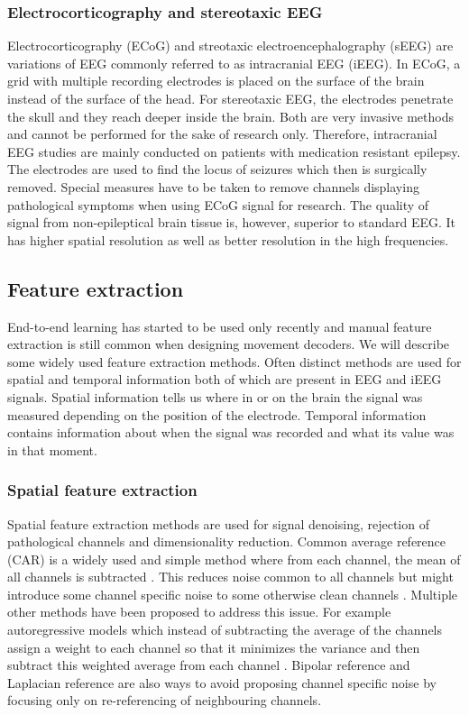 \subsubsection{Electrocorticography and stereotaxic EEG}
Electrocorticography (ECoG) and streotaxic electroencephalography (sEEG) are variations of EEG commonly referred to as intracranial EEG (iEEG).
In ECoG, a grid with multiple recording electrodes is placed on the surface of the brain instead of the surface of the head.
For stereotaxic EEG, the electrodes penetrate the skull and they reach deeper inside the brain. Both are very invasive methods and cannot be performed for the sake of research only.
Therefore, intracranial EEG studies are mainly conducted on patients with medication resistant epilepsy.
The electrodes are used to find the locus of seizures which then is surgically removed. Special measures have to be taken to remove channels displaying pathological symptoms when using ECoG signal for research.
The quality of signal from non-epileptical brain tissue is, however, superior to standard EEG. It has higher spatial resolution as well as better resolution in the high frequencies.

\subsection{Feature extraction}
End-to-end learning has started to be used only recently and manual feature extraction is still common when designing movement decoders.
We will describe some widely used feature extraction methods. 
Often distinct methods are used for spatial and temporal information both of which are present in EEG and iEEG signals. 
Spatial information tells us where in or on the brain the signal was measured depending on the position of the electrode.
Temporal information contains information about when the signal was recorded and what its value was in that moment.
\subsubsection{Spatial feature extraction}
Spatial feature extraction methods are used for signal denoising, rejection of pathological channels and dimensionality reduction.
 Common average reference (CAR) is a widely used and simple method where from each channel, the mean of all channels is subtracted \cite{liu-effects-2015}. This reduces noise common to all channels but might introduce some channel specific noise to some otherwise clean channels \cite{volkova-review}. Multiple other methods have been proposed to address this issue. For example autoregressive models which instead of subtracting the average of the channels assign a weight to each channel so that it minimizes the variance and then subtract this weighted average from each channel \cite{adaptive-laplacian-reference}. Bipolar reference and Laplacian reference \cite{yao2019reference, laplacian-reference} are also ways to avoid proposing channel specific noise by focusing only on re-referencing of neighbouring channels. \\
 
